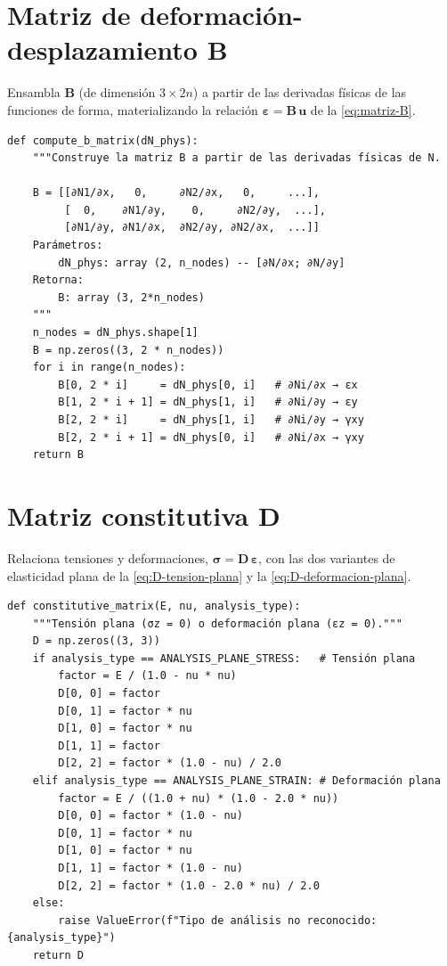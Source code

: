 \section{Matriz de deformación-desplazamiento \texorpdfstring{$\bm{B}$}{B}}

Ensambla $\bm{B}$ (de dimensión $3\times 2n$) a partir de las derivadas físicas de las funciones de forma, materializando la relación $\bm{\varepsilon} = \bm{B}\,\bm{u}$ de la \autoref{eq:matriz-B}.

\begin{lstlisting}
def compute_b_matrix(dN_phys):
    """Construye la matriz B a partir de las derivadas físicas de N.

    B = [[∂N1/∂x,   0,     ∂N2/∂x,   0,     ...],
         [  0,    ∂N1/∂y,    0,     ∂N2/∂y,  ...],
         [∂N1/∂y, ∂N1/∂x,  ∂N2/∂y, ∂N2/∂x,  ...]]
    Parámetros:
        dN_phys: array (2, n_nodes) -- [∂N/∂x; ∂N/∂y]
    Retorna:
        B: array (3, 2*n_nodes)
    """
    n_nodes = dN_phys.shape[1]
    B = np.zeros((3, 2 * n_nodes))
    for i in range(n_nodes):
        B[0, 2 * i]     = dN_phys[0, i]   # ∂Ni/∂x → εx
        B[1, 2 * i + 1] = dN_phys[1, i]   # ∂Ni/∂y → εy
        B[2, 2 * i]     = dN_phys[1, i]   # ∂Ni/∂y → γxy
        B[2, 2 * i + 1] = dN_phys[0, i]   # ∂Ni/∂x → γxy
    return B
\end{lstlisting}

\section{Matriz constitutiva \texorpdfstring{$\bm{D}$}{D}}

Relaciona tensiones y deformaciones, $\bm{\sigma} = \bm{D}\,\bm{\varepsilon}$, con las dos variantes de elasticidad plana de la \autoref{eq:D-tension-plana} y la \autoref{eq:D-deformacion-plana}.

\begin{lstlisting}
def constitutive_matrix(E, nu, analysis_type):
    """Tensión plana (σz = 0) o deformación plana (εz = 0)."""
    D = np.zeros((3, 3))
    if analysis_type == ANALYSIS_PLANE_STRESS:   # Tensión plana
        factor = E / (1.0 - nu * nu)
        D[0, 0] = factor
        D[0, 1] = factor * nu
        D[1, 0] = factor * nu
        D[1, 1] = factor
        D[2, 2] = factor * (1.0 - nu) / 2.0
    elif analysis_type == ANALYSIS_PLANE_STRAIN: # Deformación plana
        factor = E / ((1.0 + nu) * (1.0 - 2.0 * nu))
        D[0, 0] = factor * (1.0 - nu)
        D[0, 1] = factor * nu
        D[1, 0] = factor * nu
        D[1, 1] = factor * (1.0 - nu)
        D[2, 2] = factor * (1.0 - 2.0 * nu) / 2.0
    else:
        raise ValueError(f"Tipo de análisis no reconocido: {analysis_type}")
    return D
\end{lstlisting}

